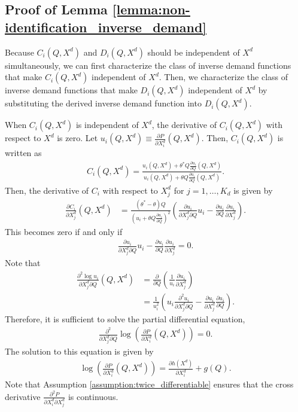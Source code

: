 \documentclass[11pt, a4paper]{article}
\theoremstyle{remark}
\begin{document}
\subsection{Proof of Lemma \ref{lemma:non-identification_inverse_demand}}
Because $C_i(Q, X^{d})$ and $D_i(Q, X^{d})$ should be independent of $X^{d}$ simultaneously, we can first characterize the class of inverse demand functions that make $C_i(Q, X^{d})$ independent of $X^{d}$.
Then, we characterize the class of inverse demand functions that make $D_i(Q, X^{d})$ independent of $X^{d}$ by substituting the derived inverse demand function into $D_i(Q, X^{d})$.

When $C_i(Q, X^{d})$ is independent of $X^{d}$, the derivative of $C_i(Q, X^{d})$ with respect to $X^{d}$ is zero.
Let $u_i(Q, X^{d}) \equiv \frac{\partial P}{\partial X^{d}_i}(Q, X^{d})$.
Then, $C_i(Q, X^{d})$ is written as
\begin{align}
    C_i(Q, X^{d}) = \frac{u_i(Q, X^{d}) + \theta^{*} Q \frac{\partial u_i}{\partial Q}(Q, X^{d})}{ u_i(Q, X^{d}) + \theta Q \frac{\partial u_i}{\partial Q}(Q, X^{d})}.
\end{align}
Then, the derivative of $C_i$ with respect to $X^{d}_j$ for $j = 1, \ldots, K_d$ is given by
\begin{align}
    \frac{\partial C_i}{\partial X^{d}_j}(Q, X^{d}) & = \frac{(\theta^{*} - \theta)Q }{\left(u_i + \theta Q \frac{\partial u_i}{\partial Q}\right)^2}\left(\frac{\partial u_i}{\partial X^{d}_j\partial Q} u_i - \frac{\partial u_i}{\partial Q} \frac{\partial u_i}{\partial X^{d}_j}\right).
\end{align}
This becomes zero if and only if
\begin{align}
    \frac{\partial u_i}{\partial X^{d}_j\partial Q} u_i - \frac{\partial u_i}{\partial Q} \frac{\partial u_i}{\partial X^{d}_j} = 0.
\end{align}
Note that 
\begin{align}
    \frac{\partial^2 \log u_i}{\partial X^{d}_j \partial Q}(Q, X^{d}) & = \frac{\partial }{\partial Q}\left(\frac{1}{u_i}\frac{\partial u_i}{\partial X^{d}_j}\right)\\
    & = \frac{1}{u_i^2}\left(u_i\frac{\partial^2 u_i}{\partial X^{d}_j \partial Q} - \frac{\partial u_i}{\partial X^{d}_j}\frac{\partial u_i}{\partial Q}\right).
\end{align}
Therefore, it is sufficient to solve the partial differential equation,
\begin{align}
    \frac{\partial^2 }{\partial X^{d}_j \partial Q}\log \left(\frac{\partial P}{\partial X^{d}_i}(Q, X^{d})\right) = 0.
\end{align}
The solution to this equation is given by
\begin{align}
    \log \left(\frac{\partial P}{\partial X^{d}_i}(Q, X^{d})\right) = \frac{\partial h(X^{d})}{\partial X^{d}_i}+ g(Q).
\end{align}
Note that Assumption \ref{assumption:twice_differentiable} ensures that the cross derivative $\frac{\partial^2 P}{\partial X^{d}_i \partial X^{d}_j}$ is continuous.
\end{document}
